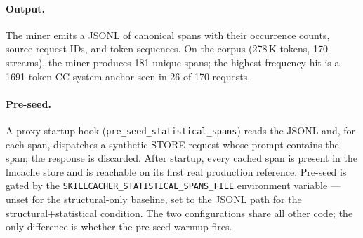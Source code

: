 \paragraph{Output.} The miner emits a JSONL of canonical spans with
their occurrence counts, source request IDs, and token sequences. On
the \dataset{} corpus (278\,K tokens, 170 streams), the miner
produces 181 unique spans; the highest-frequency hit is a 1691-token
CC system anchor seen in 26 of 170 requests.

\paragraph{Pre-seed.} A proxy-startup hook
(\texttt{pre\_seed\_statistical\_spans}) reads the JSONL and, for each
span, dispatches a synthetic STORE request whose prompt contains the
span; the response is discarded. After startup, every cached span is
present in the lmcache store and is reachable on its first real
production reference. Pre-seed is gated by the
\texttt{SKILLCACHER\_STATISTICAL\_SPANS\_FILE} environment variable
--- unset for the structural-only baseline, set to the JSONL path
for the structural+statistical condition. The two configurations
share all other code; the only difference is whether the pre-seed
warmup fires.
